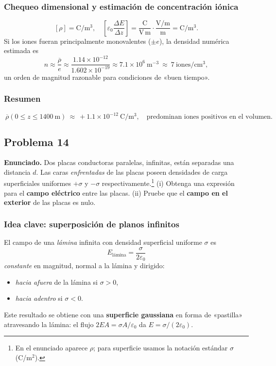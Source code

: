 \documentclass{article}
\begin{document}
\subsubsection*{Chequeo dimensional y estimación de concentración iónica}
\[
[\rho]=\mathrm{C/m^3},\quad \left[\varepsilon_0\frac{\Delta E}{\Delta z}\right]
=\frac{\mathrm{C}}{\mathrm{V\,m}}\cdot\frac{\mathrm{V/m}}{\mathrm{m}}=\mathrm{C/m^3}.
\]
Si los iones fueran principalmente monovalentes ($\pm e$), la densidad numérica estimada es
\[
n\approx \frac{\overline{\rho}}{e}\approx
\frac{1.14\times10^{-12}}{1.602\times10^{-19}}
\approx 7.1\times10^{6}\ \mathrm{m^{-3}}
\ \approx\ 7\ \mathrm{iones/cm^3},
\]
un orden de magnitud razonable para condiciones de «buen tiempo».

\subsubsection*{Resumen}
\[
\boxed{\ \overline{\rho}(0\le z\le 1400\ \mathrm{m})\ \approx\ +1.1\times10^{-12}\ \mathrm{C/m^3},\quad
\text{predominan iones positivos en el volumen.}\ }
\]

\subsection{Problema 14} \vspace{0.5cm}

\textbf{Enunciado.} Dos placas conductoras paralelas, infinitas, están separadas una distancia $d$. Las caras \emph{enfrentadas} de las placas poseen densidades de carga superficiales uniformes $+\sigma$ y $-\sigma$ respectivamente.\footnote{En el enunciado aparece $\rho$; para superficie usamos la notación estándar $\sigma$ (C/m$^2$).} 
(i) Obtenga una expresión para el \textbf{campo eléctrico} entre las placas. 
(ii) Pruebe que el \textbf{campo en el exterior} de las placas es nulo.

\subsubsection*{Idea clave: superposición de planos infinitos}
El campo de una \emph{lámina} infinita con densidad superficial uniforme $\sigma$ es
\[
\boxed{\ E_{\text{lámina}}=\frac{\sigma}{2\varepsilon_0}\, }
\]
\emph{constante} en magnitud, normal a la lámina y dirigido:
\begin{itemize}
\item \emph{hacia afuera} de la lámina si $\sigma>0$,
\item \emph{hacia adentro} si $\sigma<0$.
\end{itemize}
Este resultado se obtiene con una \textbf{superficie gaussiana} en forma de «pastilla» atravesando la lámina: el flujo $2EA=\sigma A/\varepsilon_0$ da $E=\sigma/(2\varepsilon_0)$.
\end{document}
